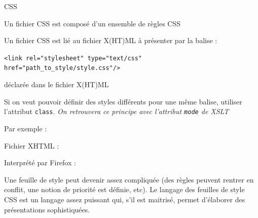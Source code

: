 \begin{frame}{CSS}
\framebreak

Un fichier CSS est compos\'e d'un ensemble de règles CSS

\bigskip

Un fichier CSS est li\'e au fichier X(HT)ML à pr\'esenter par la balise  :
\begin{small}
\verb?<link rel="stylesheet" type="text/css" href="path_to_style/style.css"/>?
\end{small}

d\'eclar\'ee dans le fichier X(HT)ML 

\framebreak

Si on veut pouvoir définir des styles différents pour une même balise, utiliser l'attribut \verb?class?. \textit{On retrouvera ce principe avec l'attribut \verb?mode? de XSLT}\\

\medskip

Par exemple :\\



\framebreak

Fichier XHTML :


\framebreak

Interpr\'et\'e par Firefox :\\
\begin{center}
\end{center}


\framebreak

Une feuille de style peut devenir assez compliqu\'ee (des r\`egles peuvent rentrer en conflit, une notion de priorit\'e est d\'efinie, etc). 
Le langage des feuilles de style CSS est un langage assez puissant qui, s'il est maitris\'e, permet d'\'elaborer des pr\'esentations sophistiqu\'ees.

\framebreak


\end{frame}
